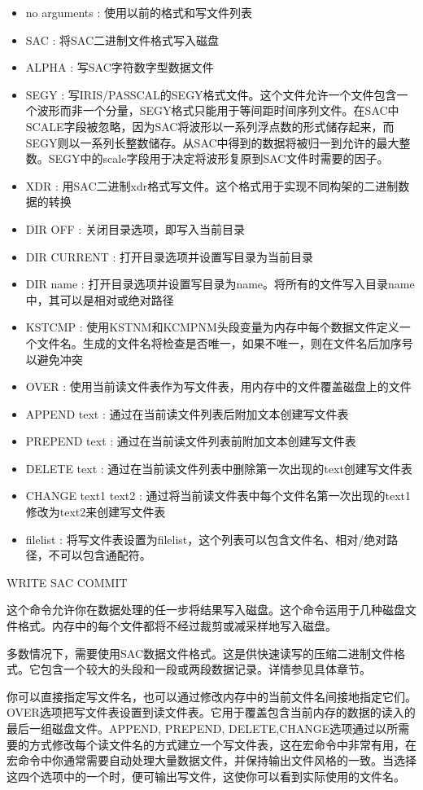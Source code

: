 \begin{itemize}
\item no arguments : 使用以前的格式和写文件列表 
\item SAC : 将SAC二进制文件格式写入磁盘 
\item ALPHA : 写SAC字符数字型数据文件 
\item SEGY : 写IRIS/PASSCAL的SEGY格式文件。这个文件允许一个文件包含一个波形而非一个分量，SEGY格式只能用于等间距时间序列文件。在SAC中SCALE字段被忽略，因为SAC将波形以一系列浮点数的形式储存起来，而SEGY则以一系列长整数储存。从SAC中得到的数据将被归一到允许的最大整数。SEGY中的scale字段用于决定将波形复原到SAC文件时需要的因子。
\item XDR : 用SAC二进制xdr格式写文件。这个格式用于实现不同构架的二进制数据的转换 
\item DIR OFF : 关闭目录选项，即写入当前目录 
\item DIR CURRENT : 打开目录选项并设置写目录为当前目录 
\item DIR name : 打开目录选项并设置写目录为name。将所有的文件写入目录name中，其可以是相对或绝对路径 
\item KSTCMP : 使用KSTNM和KCMPNM头段变量为内存中每个数据文件定义一个文件名。生成的文件名将检查是否唯一，如果不唯一，则在文件名后加序号以避免冲突
\item OVER : 使用当前读文件表作为写文件表，用内存中的文件覆盖磁盘上的文件 
\item APPEND text : 通过在当前读文件列表后附加文本创建写文件表 
\item PREPEND text : 通过在当前读文件列表前附加文本创建写文件表 
\item DELETE text :  通过在当前读文件列表中删除第一次出现的text创建写文件表 
\item CHANGE text1 text2 : 通过将当前读文件表中每个文件名第一次出现的text1修改为text2来创建写文件表 
\item filelist : 将写文件表设置为filelist，这个列表可以包含文件名、相对/绝对路径，不可以包含通配符。 
\end{itemize}

WRITE SAC COMMIT

这个命令允许你在数据处理的任一步将结果写入磁盘。这个命令运用于几种磁盘文件格式。内存中的每个文件都将不经过裁剪或减采样地写入磁盘。

多数情况下，需要使用SAC数据文件格式。这是供快速读写的压缩二进制文件格式。它包含一个较大的头段和一段或两段数据记录。详情参见具体章节。

你可以直接指定写文件名，也可以通过修改内存中的当前文件名间接地指定它们。OVER选项把写文件表设置到读文件表。它用于覆盖包含当前内存的数据的读入的最后一组磁盘文件。APPEND, PREPEND, DELETE,CHANGE选项通过以所需要的方式修改每个读文件名的方式建立一个写文件表，这在宏命令中非常有用，在宏命令中你通常需要自动处理大量数据文件，并保持输出文件风格的一致。当选择这四个选项中的一个时，便可输出写文件，这使你可以看到实际使用的文件名。

